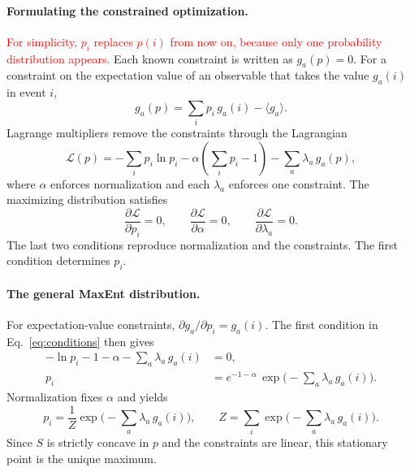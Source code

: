 \paragraph{Formulating the constrained optimization.}
\textcolor{red}{For simplicity, $p_i$ replaces $p(i)$ from now on, because
only one probability distribution appears.}
Each known constraint is written as $g_a(p)=0$. For a constraint on the
expectation value of an observable that takes the value $g_a(i)$ in event
$i$,
\begin{equation*}
    g_a(p) = \sum_i p_i\, g_a(i) - \langle g_a\rangle .
\end{equation*}
Lagrange multipliers remove the constraints through the Lagrangian
\begin{equation}
    \boxed{\mathcal{L}(p)
    = -\sum_i p_i \ln p_i
    - \alpha\left(\sum_i p_i - 1\right)
    - \sum_a \lambda_a\, g_a(p),}
\end{equation}
where $\alpha$ enforces normalization and each $\lambda_a$ enforces one
constraint. The maximizing distribution satisfies
\begin{equation}
    \boxed{\frac{\partial \mathcal{L}}{\partial p_i} = 0,
    \qquad
    \frac{\partial \mathcal{L}}{\partial \alpha} = 0,
    \qquad
    \frac{\partial \mathcal{L}}{\partial \lambda_a} = 0.}
    \label{eq:conditions}
\end{equation}
The last two conditions reproduce normalization and the constraints. The
first condition determines $p_i$.

\paragraph{The general MaxEnt distribution.}
For expectation-value constraints, $\partial g_a/\partial p_i = g_a(i)$. The
first condition in Eq.~\eqref{eq:conditions} then gives
\begin{align*}
    -\ln p_i - 1 - \alpha - \sum_a \lambda_a\, g_a(i) &= 0, \\
    p_i &= e^{-1-\alpha}\, \exp\!\Big(-\sum_a \lambda_a\, g_a(i)\Big).
\end{align*}
Normalization fixes $\alpha$ and yields
\begin{equation}
    \boxed{p_i = \frac{1}{Z}\exp\!\Big(-\sum_a \lambda_a\, g_a(i)\Big),
    \qquad
    Z = \sum_i \exp\!\Big(-\sum_a \lambda_a\, g_a(i)\Big).}
\end{equation}
Since $S$ is strictly concave in $p$ and the constraints are linear, this
stationary point is the unique maximum.
